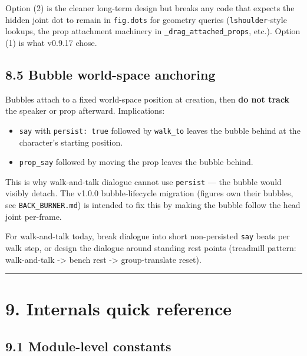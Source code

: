 \documentclass[
  11pt,
]{book}
\providecommand{\tightlist}{%
  \setlength{\itemsep}{0pt}\setlength{\parskip}{0pt}}
\begin{document}
Option (2) is the cleaner long-term design but breaks any code that
expects the hidden joint dot to remain in \texttt{fig.dots} for
geometry queries (\texttt{lshoulder}-style lookups, the prop
attachment machinery in \texttt{\_drag\_attached\_props}, etc.).
Option (1) is what v0.9.17 chose.

\subsection{8.5 Bubble world-space
anchoring}\label{bubble-world-space-anchoring}

Bubbles attach to a fixed world-space position at creation, then
\textbf{do not track} the speaker or prop afterward. Implications:

\begin{itemize}
\tightlist
\item
  \texttt{say} with \texttt{persist:\ true} followed by
  \texttt{walk\_to} leaves the bubble behind at the character's starting
  position.
\item
  \texttt{prop\_say} followed by moving the prop leaves the bubble
  behind.
\end{itemize}

This is why walk-and-talk dialogue cannot use \texttt{persist} --- the
bubble would visibly detach. The v1.0.0 bubble-lifecycle migration
(figures own their bubbles, see \texttt{BACK\_BURNER.md}) is intended to
fix this by making the bubble follow the head joint per-frame.

For walk-and-talk today, break dialogue into short non-persisted
\texttt{say} beats per walk step, or design the dialogue around standing
rest points (treadmill pattern: walk-and-talk -\textgreater{} bench rest
-\textgreater{} group-translate reset).

\begin{center}\rule{0.5\linewidth}{0.5pt}\end{center}

\section{9. Internals quick reference}\label{internals-quick-reference}

\subsection{9.1 Module-level constants}\label{module-level-constants}
\end{document}
